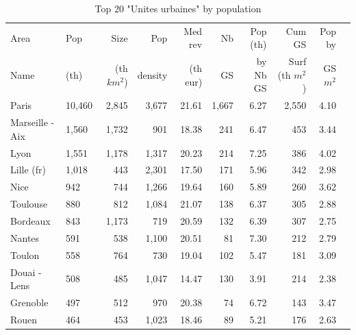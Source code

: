 \documentclass[11pt]{article}
\begin{document}
\begin{table}[H]
\caption{Top 20 "Unites urbaines" by population}
\small
\renewcommand{\arraystretch}{0.7}%

\begin{tabular}{llrrrrrrrr}
\toprule
\toprule
Area             &      Pop   &   Size     &  Pop         & Med rev    & Nb         &  Pop (th)  & Cum GS          & Pop by       \\
Name             &      (th)  & (th $km^2$)&  density     & (th eur)   & GS         &  by Nb GS  & Surf (th $m^2$) & GS $m^2$  \\
\midrule
             Paris &     10,460 &      2,845 &        3,677 &      21.61 &      1,667 &       6.27 &      2,550 &        4.10 \\
   Marseille - Aix &      1,560 &      1,732 &          901 &      18.38 &        241 &       6.47 &        453 &        3.44 \\
              Lyon &      1,551 &      1,178 &        1,317 &      20.23 &        214 &       7.25 &        386 &        4.02 \\
        Lille (fr) &      1,018 &        443 &        2,301 &      17.50 &        171 &       5.96 &        342 &        2.98 \\
              Nice &        942 &        744 &        1,266 &      19.64 &        160 &       5.89 &        260 &        3.62 \\
          Toulouse &        880 &        812 &        1,084 &      21.07 &        138 &       6.37 &        305 &        2.88 \\
          Bordeaux &        843 &      1,173 &          719 &      20.59 &        132 &       6.39 &        307 &        2.75 \\
            Nantes &        591 &        538 &        1,100 &      20.51 &         81 &       7.30 &        212 &        2.79 \\
            Toulon &        558 &        764 &          730 &      19.04 &        102 &       5.47 &        181 &        3.09 \\
      Douai - Lens &        508 &        485 &        1,047 &      14.47 &        130 &       3.91 &        214 &        2.38 \\
          Grenoble &        497 &        512 &          970 &      20.38 &         74 &       6.72 &        143 &        3.47 \\
             Rouen &        464 &        453 &        1,023 &      18.46 &         89 &       5.21 &        176 &        2.63 \\

\end{tabular}
\end{table}
\end{document}
